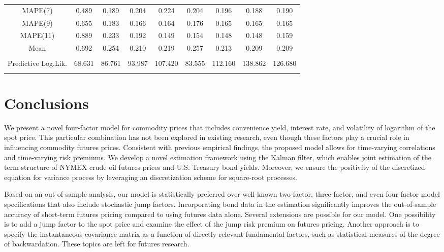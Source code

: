 \documentclass{article}
\begin{document}
\begin{table}[h!]
{\begin{tabular}{S ccc ccc cc}
{MAPE(7)} & 0.489 & 0.189 & 0.204 & 0.224 & 0.204 & 0.196 & 0.188 & 0.190 \\
{MAPE(9)} & 0.655 & 0.183 & 0.166 & 0.164 & 0.176 & 0.165 & 0.165 & 0.165 \\
{MAPE(11)} & 0.889 & 0.233 & 0.192 & 0.149 & 0.154 & 0.148 & 0.148 & 0.159 \\
\hline\noalign{\smallskip} 
{Mean} & 0.692 & 0.254 & 0.210 & 0.219 & 0.257 & 0.213 & 0.209 & 0.209 \\
     \hline\noalign{\smallskip} \\
      \hline\noalign{\smallskip} 
     {Predictive Log.Lik.} & 68.631 & 86.761 & 93.987 & 107.420 & 83.555 & 112.160 & 138.862 & 126.680\\
     \hline\noalign{\smallskip}
\end{tabular} 
}
\end{table}




\section{Conclusions} 
\label{sec_conclusions}


We present a novel four-factor model for commodity prices that includes convenience yield, interest rate, and volatility of logarithm of the spot price.  This particular combination has not been explored in existing research, even though these factors play a crucial role in influencing commodity futures prices. Consistent with previous empirical findings, the proposed model allows for time-varying correlations and time-varying risk premiums. We develop a novel estimation framework using the Kalman filter, which enables joint estimation of the term structure of NYMEX crude oil futures prices and U.S. Treasury bond yields. Moreover, we ensure the positivity of the discretized equation for variance process by leveraging an discretization scheme for square-root processes. 

Based on an out-of-sample analysis, our model is statistically preferred over well-known two-factor, three-factor, and even four-factor model specifications that also include stochastic jump factors. Incorporating bond data in the estimation significantly improves the out-of-sample accuracy of short-term futures pricing compared to using futures data alone. Several extensions are possible for our model. One possibility is to add a jump factor to the spot price and examine the effect of the jump risk premium on futures pricing. Another approach is to specify the instantaneous covariance matrix as a function of directly relevant fundamental factors, such as statistical measures of the degree of backwardation. These topics are left for futures research.
\end{document}
